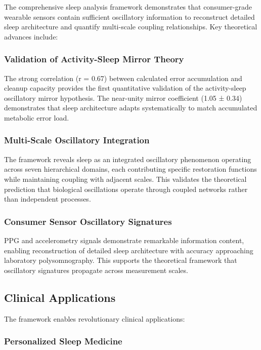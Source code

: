 \documentclass[twocolumn]{article}
\begin{document}
The comprehensive sleep analysis framework demonstrates that consumer-grade wearable sensors contain sufficient oscillatory information to reconstruct detailed sleep architecture and quantify multi-scale coupling relationships. Key theoretical advances include:

\subsubsection{Validation of Activity-Sleep Mirror Theory}

The strong correlation (r = 0.67) between calculated error accumulation and cleanup capacity provides the first quantitative validation of the activity-sleep oscillatory mirror hypothesis. The near-unity mirror coefficient (1.05 ± 0.34) demonstrates that sleep architecture adapts systematically to match accumulated metabolic error load.

\subsubsection{Multi-Scale Oscillatory Integration}

The framework reveals sleep as an integrated oscillatory phenomenon operating across seven hierarchical domains, each contributing specific restoration functions while maintaining coupling with adjacent scales. This validates the theoretical prediction that biological oscillations operate through coupled networks rather than independent processes.

\subsubsection{Consumer Sensor Oscillatory Signatures}

PPG and accelerometry signals demonstrate remarkable information content, enabling reconstruction of detailed sleep architecture with accuracy approaching laboratory polysomnography. This supports the theoretical framework that oscillatory signatures propagate across measurement scales.

\subsection{Clinical Applications}

The framework enables revolutionary clinical applications:

\subsubsection{Personalized Sleep Medicine}
\end{document}
